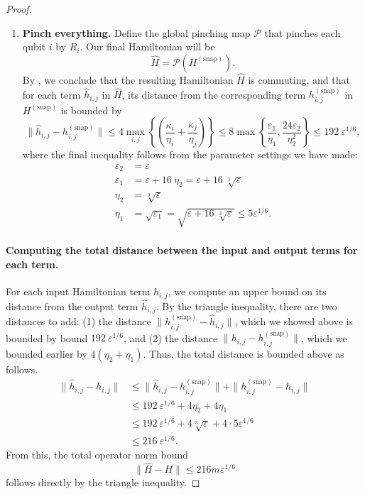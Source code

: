 \documentclass[11pt]{article}
\theoremstyle{plain}
\newcommand{\eps}{\varepsilon}
\renewcommand{\cP}{\mathcal{P}}
\newcommand{\snp}{{(\mathrm{snap})}}
\begin{document}
\begin{proof}
\begin{enumerate}
Now, we will use transitivity: we know that $\|[B_i^\beta, A_i^\alpha]\| \leq \eps_2$ and $\|[A_i^\alpha, R_i]\| \leq \eps_2$, so by , we conclude that 
\begin{equation}
    \| [B_i^\beta, R_i] \| \leq \frac{6\eps_2}{\Delta(A_i^\alpha)} \leq \frac{6 \eps_2}{\eta_2},
\end{equation}
where we are assuming that $\eps_2 \leq \eta_2$ and moreover that the terms of the Hamiltonian have operator norm at most $1$. So we have
\[ \| [h^\snp_{i,k}, R_i \otimes I_k ] \| \leq \frac{24\eps_2}{\eta_2}. \]
    \item \textbf{Pinch everything.} Define the global pinching map $\cP$ that pinches each qubit $i$ by $R_i$. Our final Hamiltonian will be
    \[ \widehat{H} = \cP(H^\snp).\]
    By , we conclude that the resulting Hamiltonian $\widehat{H}$ is commuting, and that for each term $\widehat{h}_{i,j}$ in $\widehat{H}$, its distance from the corresponding term $h^\snp_{i,j}$ in $H^\snp$ is bounded by
    \[ \|\hat{h}_{i,j} - h^\snp_{i,j} \| \leq  4\max_{i,j} \left\{ \left(\frac{\kappa_i}{\eta_i} + \frac{\kappa_j}{\eta_j} \right) \right\} \leq 8 \max\left\{ \frac{\eps_1}{\eta_1}, \frac{24\eps_2}{\eta_2^2} \right\} \leq 192\ \eps^{1/6}, \]
where the final inequality follows from the parameter settings we have made:
    \begin{align*}
        \eps_2 &= \eps\\
        \eps_1 &= \eps + 16\ \eta_2 = \eps + 16\ \sqrt[3]{\eps}\\
        \eta_2 &= \sqrt[3]{\eps}\\
        \eta_1 &= \sqrt{\eps_1} = \sqrt{\eps + 16\ \sqrt[3]{\eps}} \leq 5 \eps^{1/6}.
    \end{align*}
\end{enumerate}


\paragraph{Computing the total distance between the input and output terms for each term.}
For each input Hamiltonian term $h_{i,j}$, we compute an upper bound on its distance from the output term $\hat{h}_{i,j}$. By the triangle inequality, there are two distances to add: (1) the distance $\|h^\snp_{i,j} - \hat{h}_{i,j}\|$, which we showed above is bounded by bound $192\ \eps^{1/6}$, and (2) the distance $\|h_{i,j} - h^\snp_{i,j} \|$, which we bounded earlier by $4 (\eta_2 + \eta_1)$. Thus, the total distance is bounded above as follows.
\begin{align*}
    \|\hat{h}_{i,j} - h_{i,j}\| &\leq \|\hat{h}_{i,j} - h^\snp_{i,j}\| + \|h^\snp_{i,j} - h_{i,j}\|\\
    & \leq 192\ \eps^{1/6} + 4 \eta_2 + 4 \eta_1\\
    & \leq 192\ \eps^{1/6} + 4 \sqrt[3]{\eps} + 4 \cdot 5 \eps^{1/6} \\
    & \leq 216\ \eps^{1/6}.
\end{align*}
From this, the total operator norm bound
\[ \|\hat{H} - H \| \leq 216 m \eps^{1/6} \]
follows directly by the triangle inequality.



\end{proof}
\end{document}
